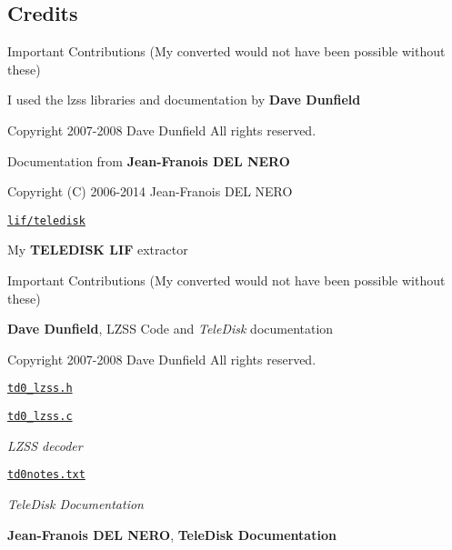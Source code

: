 \subsection*{Credits}


\begin{DoxyItemize}
\item Important Contributions (My converted would not have been possible without these)
\item I used the lzss libraries and documentation by {\bfseries Dave Dunfield}
\begin{DoxyItemize}
\item Copyright 2007-\/2008 Dave Dunfield All rights reserved.
\end{DoxyItemize}
\item Documentation from {\bfseries Jean-\/\+Franois D\+EL N\+E\+RO}
\begin{DoxyItemize}
\item Copyright (C) 2006-\/2014 Jean-\/\+Franois D\+EL N\+E\+RO
\end{DoxyItemize}
\item \href{lif/teledisk}{\tt lif/teledisk}
\begin{DoxyItemize}
\item My {\bfseries T\+E\+L\+E\+D\+I\+SK L\+IF} extractor
\item Important Contributions (My converted would not have been possible without these)
\begin{DoxyItemize}
\item {\bfseries Dave Dunfield}, L\+Z\+SS Code and {\itshape Tele\+Disk} documentation
\begin{DoxyItemize}
\item Copyright 2007-\/2008 Dave Dunfield All rights reserved.
\item \href{lif/teledisk/td0_lzss.h}{\tt td0\+\_\+lzss.\+h}
\item \href{lif/teledisk/td0_lzss.c}{\tt td0\+\_\+lzss.\+c}
\begin{DoxyItemize}
\item {\itshape L\+Z\+SS decoder}
\end{DoxyItemize}
\item \href{lif/teledisk/td0notes.txt}{\tt td0notes.\+txt}
\begin{DoxyItemize}
\item {\itshape Tele\+Disk Documentation}
\end{DoxyItemize}
\end{DoxyItemize}
\item {\bfseries Jean-\/\+Franois D\+EL N\+E\+RO}, {\bfseries Tele\+Disk Documentation}

\end{DoxyItemize}
\end{DoxyItemize}
\end{DoxyItemize}
